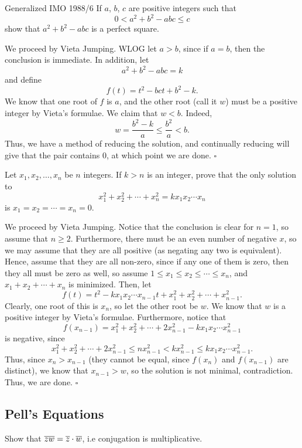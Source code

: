 \documentclass{article}
\begin{document}
\begin{problem}[4.7.3]{Generalized IMO 1988/6}
If $a$, $b$, $c$ are positive integers such that \[0 < a^2 + b^2 - abc \le c\] show that $a^2+b^2-abc$ is a perfect square.
\end{problem}

We proceed by Vieta Jumping. WLOG let $a > b$, since if $a = b$, then the conclusion is immediate. In addition, let \[a^2+b^2-abc = k\] and define \[f(t) = t^2-bct+b^2-k.\] We know that one root of $f$ is $a$, and the other root (call it $w$) must be a positive integer by Vieta's formulae. We claim that $w < b$. Indeed, \[w = \dfrac{b^2-k}{a} \le \dfrac{b^2}{a} < b.\] Thus, we have a method of reducing the solution, and continually reducing will give that the pair contains $0$, at which point we are done. $\square$

\begin{problem}[4.7.4]{}
Let $x_1, x_2, \dots, x_n$ be $n$ integers. If $k > n$ is an integer, prove that the only solution to \[x_1^2 + x_2^2 + \cdots + x_n^2 = kx_1x_2\cdots x_n\] is $x_1 = x_2 = \cdots = x_n = 0$.
\end{problem}

We proceed by Vieta Jumping. Notice that the conclusion is clear for $n = 1$, so assume that $n \ge 2$. Furthermore, there must be an even number of negative $x$, so we may assume that they are all positive (as negating any two is equivalent). Hence, assume that they are all non-zero, since if any one of them is zero, then they all must be zero as well, so assume $1 \le x_1 \le x_2 \le \cdots \le x_n$, and $x_1+x_2+\cdots+x_n$ is minimized. Then, let \[f(t) = t^2-kx_1x_2\cdots x_{n-1}t+x_1^2+x_2^2+\cdots+x_{n-1}^2.\] Clearly, one root of this is $x_n$, so let the other root be $w$. We know that $w$ is a positive integer by Vieta's formulae. Furthermore, notice that \[f(x_{n-1}) = x_1^2+x_2^2+\cdots+2x_{n-1}^2-kx_1x_2\cdots x_{n-1}^2\] is negative, since \[x_1^2+x_2^2+\cdots+2x_{n-1}^2 \le nx_{n-1}^2 < kx_{n-1}^2 \le kx_1x_2\cdots x_{n-1}^2.\] Thus, since $x_n > x_{n-1}$ (they cannot be equal, since $f(x_n)$ and $f(x_{n-1})$ are distinct), we know that $x_{n-1} > w$, so the solution is not minimal, contradiction. Thus, we are done. $\square$

\subsection{Pell's Equations}

\begin{problem}[4.8.1]{}
Show that $\overline{zw} = \overline{z}\cdot\overline{w}$, i.e conjugation is multiplicative.
\end{problem}
\end{document}

